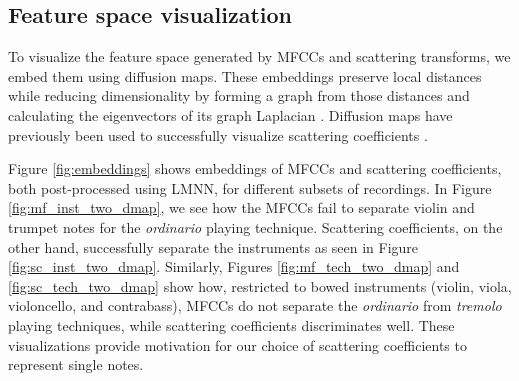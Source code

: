 \subsection{Feature space visualization}

To visualize the feature space generated by MFCCs and scattering transforms, we embed them using diffusion maps.
These embeddings preserve local distances while reducing dimensionality by forming a graph from those distances and calculating the eigenvectors of its graph Laplacian \cite{lafon2006acha}.
Diffusion maps have previously been used to successfully visualize scattering coefficients \cite{chudacek2014embc,villoutreix2017plos}.

Figure \ref{fig:embeddings} shows embeddings of MFCCs and scattering coefficients, both post-processed using LMNN, for different subsets of recordings.
In Figure \ref{fig:mf_inst_two_dmap}, we see how the MFCCs fail to separate violin and trumpet notes for the \emph{ordinario} playing technique.
Scattering coefficients, on the other hand, successfully separate the instruments as seen in Figure \ref{fig:sc_inst_two_dmap}.
Similarly, Figures \ref{fig:mf_tech_two_dmap} and \ref{fig:sc_tech_two_dmap} show how, restricted to bowed instruments (violin, viola, violoncello, and contrabass), MFCCs do not separate the \emph{ordinario} from \emph{tremolo} playing techniques, while scattering coefficients discriminates well.
These visualizations provide motivation for our choice of scattering coefficients to represent single notes.


